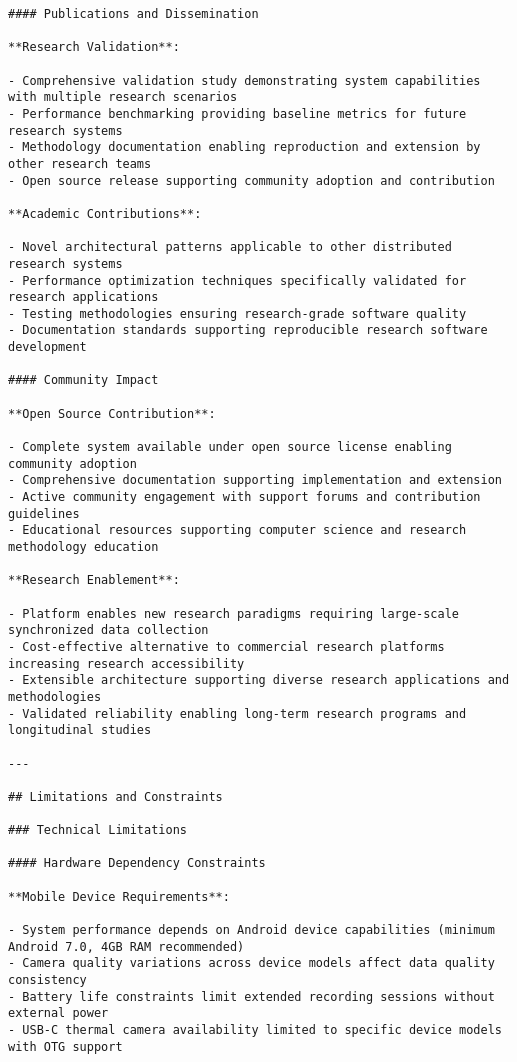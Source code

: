 \documentclass[12pt,a4paper]{report}
\begin{document}
\begin{verbatim}
#### Publications and Dissemination

**Research Validation**:

- Comprehensive validation study demonstrating system capabilities with multiple research scenarios
- Performance benchmarking providing baseline metrics for future research systems
- Methodology documentation enabling reproduction and extension by other research teams
- Open source release supporting community adoption and contribution

**Academic Contributions**:

- Novel architectural patterns applicable to other distributed research systems
- Performance optimization techniques specifically validated for research applications
- Testing methodologies ensuring research-grade software quality
- Documentation standards supporting reproducible research software development

#### Community Impact

**Open Source Contribution**:

- Complete system available under open source license enabling community adoption
- Comprehensive documentation supporting implementation and extension
- Active community engagement with support forums and contribution guidelines
- Educational resources supporting computer science and research methodology education

**Research Enablement**:

- Platform enables new research paradigms requiring large-scale synchronized data collection
- Cost-effective alternative to commercial research platforms increasing research accessibility
- Extensible architecture supporting diverse research applications and methodologies
- Validated reliability enabling long-term research programs and longitudinal studies

---

## Limitations and Constraints

### Technical Limitations

#### Hardware Dependency Constraints

**Mobile Device Requirements**:

- System performance depends on Android device capabilities (minimum Android 7.0, 4GB RAM recommended)
- Camera quality variations across device models affect data quality consistency
- Battery life constraints limit extended recording sessions without external power
- USB-C thermal camera availability limited to specific device models with OTG support


\end{verbatim}
\end{document}
